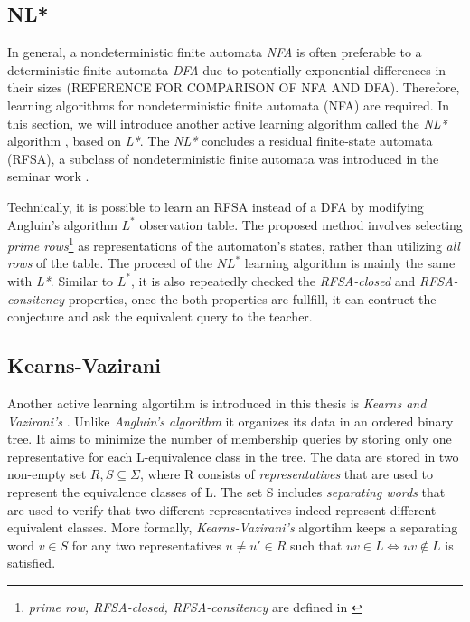 \subsection{NL*}
In general, a nondeterministic finite automata \textit{NFA} is often preferable to a 
deterministic finite automata \textit{DFA} due to potentially exponential 
differences in their sizes (REFERENCE FOR COMPARISON OF NFA AND DFA).
Therefore, learning algorithms for nondeterministic finite automata (NFA) are required.
In this section, we will introduce another active learning algorithm called the \textit{NL*} algorithm \cite*{Bollig2009AngluinStyleLO},
based on \textit{L*}. The \textit{NL*} concludes a residual finite-state automata (RFSA), 
a subclass of nondeterministic finite automata was introduced in the seminar work \cite*{10.1007/3-540-44693-1_13}.

Technically, it is possible to learn an RFSA instead of a DFA by modifying Angluin's algorithm $L^*$ observation table.
The proposed method involves selecting \textit{prime rows}\footnote{\label{notenl}\textit{prime row, RFSA-closed, RFSA-consitency} are defined in \cite{Bollig2009AngluinStyleLO}} as representations of the automaton's states, 
rather than utilizing \textit{all rows} of the table. 
The proceed of the \textit{$NL^*$} learning algorithm is mainly the same with \textit{L*}.
Similar to \textit{$L^*$}, it is also repeatedly checked the \textit{RFSA-closed}
and \textit{RFSA-consitency} properties, once the both properties are fullfill, 
it can contruct the conjecture and ask the equivalent query to the teacher.

\subsection{Kearns-Vazirani}
Another active learning algortihm is introduced in this thesis is \textit{Kearns and Vazirani's} \cite*{kearns1994introduction}.
Unlike \textit{Angluin's algorithm} it organizes its data in an ordered binary tree. 
It aims to minimize the number of membership queries by storing only one representative for 
each L-equivalence class in the tree.
The data are stored in two non-empty set $R, S \subseteq \Sigma$, where R consists
of \textit{representatives} that are used to represent the equivalence classes of L.
The set S includes \textit{separating words} that are used to verify that two 
different representatives indeed represent different equivalent classes.
More formally, \textit{Kearns-Vazirani's} algortihm keeps a separating word $v \in S$
for any two  representatives $u \ne u' \in R$ such that $uv \in L \Leftrightarrow uv \notin L$ is satisfied.


